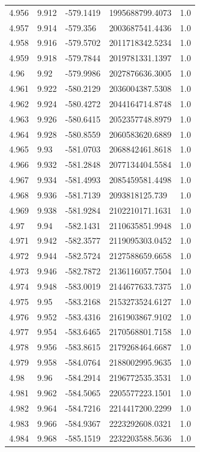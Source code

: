 \begin{tabular}{lllll}
4.956 & 9.912 & -579.1419 & 1995688799.4073 & 1.0 \\
4.957 & 9.914 & -579.356 & 2003687541.4436 & 1.0 \\
4.958 & 9.916 & -579.5702 & 2011718342.5234 & 1.0 \\
4.959 & 9.918 & -579.7844 & 2019781331.1397 & 1.0 \\
4.96 & 9.92 & -579.9986 & 2027876636.3005 & 1.0 \\
4.961 & 9.922 & -580.2129 & 2036004387.5308 & 1.0 \\
4.962 & 9.924 & -580.4272 & 2044164714.8748 & 1.0 \\
4.963 & 9.926 & -580.6415 & 2052357748.8979 & 1.0 \\
4.964 & 9.928 & -580.8559 & 2060583620.6889 & 1.0 \\
4.965 & 9.93 & -581.0703 & 2068842461.8618 & 1.0 \\
4.966 & 9.932 & -581.2848 & 2077134404.5584 & 1.0 \\
4.967 & 9.934 & -581.4993 & 2085459581.4498 & 1.0 \\
4.968 & 9.936 & -581.7139 & 2093818125.739 & 1.0 \\
4.969 & 9.938 & -581.9284 & 2102210171.1631 & 1.0 \\
4.97 & 9.94 & -582.1431 & 2110635851.9948 & 1.0 \\
4.971 & 9.942 & -582.3577 & 2119095303.0452 & 1.0 \\
4.972 & 9.944 & -582.5724 & 2127588659.6658 & 1.0 \\
4.973 & 9.946 & -582.7872 & 2136116057.7504 & 1.0 \\
4.974 & 9.948 & -583.0019 & 2144677633.7375 & 1.0 \\
4.975 & 9.95 & -583.2168 & 2153273524.6127 & 1.0 \\
4.976 & 9.952 & -583.4316 & 2161903867.9102 & 1.0 \\
4.977 & 9.954 & -583.6465 & 2170568801.7158 & 1.0 \\
4.978 & 9.956 & -583.8615 & 2179268464.6687 & 1.0 \\
4.979 & 9.958 & -584.0764 & 2188002995.9635 & 1.0 \\
4.98 & 9.96 & -584.2914 & 2196772535.3531 & 1.0 \\
4.981 & 9.962 & -584.5065 & 2205577223.1501 & 1.0 \\
4.982 & 9.964 & -584.7216 & 2214417200.2299 & 1.0 \\
4.983 & 9.966 & -584.9367 & 2223292608.0321 & 1.0 \\
4.984 & 9.968 & -585.1519 & 2232203588.5636 & 1.0 \\

\end{tabular}

